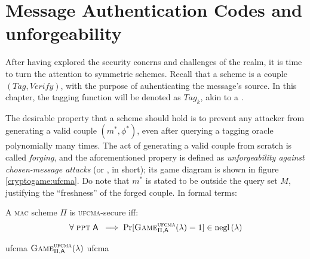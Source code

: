 
\section{Message Authentication Codes and unforgeability}

After having explored the security conerns and challenges of the \ske{} realm, it is time to turn the attention to symmetric \mac{} schemes. Recall that a \mac{} scheme is a couple $(\textit{Tag}, \textit{Verify})$, with the purpose of auhenticating the message's source. In this chapter, the tagging function will be denoted as $\textit{Tag}_k$, akin to a \prf.

The desirable property that a \mac{} scheme should hold is to prevent any attacker from generating a valid couple $(m^*, \phi^*)$, even after querying a tagging oracle polynomially many times\footnotemark.
The act of generating a valid couple from scratch is called \emph{forging}, and the aforementioned propery is defined as \emph{unforgeability against chosen-message attacks} (or \ufcma, in short); its game diagram is shown in figure \ref{cryptogame:ufcma}. Do note that $m^*$ is stated to be outside the query set $M$, justifying the ``freshness'' of the forged couple\footnotemark. In formal terms:


\begin{definition}
    A \textsc{mac} scheme $\Pi$ is \textsc{ufcma}-secure iff:
    \[
        \forall\; \ppt\; \adversary\; \implies \Pr[\cryptog{ufcma}(\lambda) = 1] \in \negl{\lambda}  
    \]
\end{definition}

\begin{cryptogame}
    {ufcma}
    {$\cryptog{ufcma}(\lambda)$}
    {ufcma}


    \cseqbeginloop
    \cseqendloop
    
    \cseqdelay

    
\end{cryptogame}

